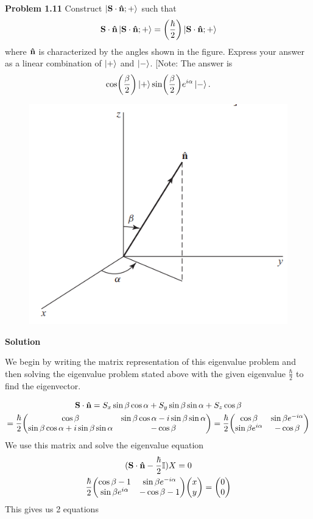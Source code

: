 \item \textbf{Problem 1.11}
Construct $\ket{\vb S\cdot\vu n;+}$ such that
\[
	\vb S \cdot \vu n \ket{\vb S\cdot\vu n;+} = \qty(\frac{\hbar}{2}) \ket{\vb S\cdot\vu n;+}
\]
where $\vu n$ is characterized by the angles shown in the figure. Express your answer as a
linear combination of $\ket+$ and $\ket -$. [Note: The answer is
\[
	\cos(\frac \beta2) \ket + \sin(\frac \beta2) e^{i\alpha}\ket -.
\]
\begin{figure}[h]
	\centering
	\includegraphics[width=0.5\linewidth]{P4.png}
\end{figure}

\textbf{Solution}

We begin by writing the matrix representation of this eigenvalue problem and then solving the eigenvalue problem stated above with the given eigenvalue $\frac{\hbar}{2}$ to find the eigenvector.

\begin{gather*}
	\vb S \cdot \vu n = S_x \sin\beta \cos\alpha + S_y \sin\beta\sin\alpha + S_z \cos\beta\\
	=\frac\hbar2 \mqty(\cos\beta & \sin\beta\cos\alpha - i\sin\beta\sin\alpha\\
	\sin\beta\cos\alpha + i\sin\beta\sin\alpha & -\cos\beta) = \frac\hbar2 \mqty(\cos\beta & \sin\beta e^{-i\alpha} \\ \sin\beta e^{i\alpha} & -\cos\beta)\\
\end{gather*}
We use this matrix and solve the eigenvalue equation
\begin{gather*}
	(\vb S\cdot \vu n - \frac\hbar2 \mathbb{I}) X = 0\\
	\frac{\hbar}{2} \mqty(\cos\beta -1 & \sin\beta e^{-i\alpha} \\ \sin\beta e^{i\alpha} & -\cos\beta - 1) \mqty(x \\ y) = \mqty(0\\0)\\
\end{gather*}
This gives us 2 equations

